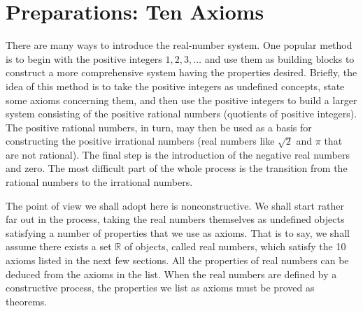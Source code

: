 	\chapter{Preparations: Ten Axioms}
    There are many ways to introduce the real-number system. One popular method is to begin with the positive integers \(1, 2, 3, \ldots\) and use them as building blocks to construct a more comprehensive system having the properties desired. Briefly, the idea of this method is to take the positive integers as undefined concepts, state some axioms concerning them, and then use the positive integers to build a larger system consisting of the positive rational numbers (quotients of positive integers). The positive rational numbers, in turn, may then be used as a basis for constructing the positive irrational numbers (real numbers like \(\sqrt{2}\) and \(\pi\) that are not rational). The final step is the introduction of the negative real numbers and zero. The most difficult part of the whole process is the transition from the rational numbers to the irrational numbers.

    The point of view we shall adopt here is nonconstructive. We shall start rather far out in the process, taking the real numbers themselves as undefined objects satisfying a number of properties that we use as axioms. That is to say, we shall assume there exists a set \(\mathbb{R}\) of objects, called real numbers, which satisfy the 10 axioms listed in the next few sections. All the properties of real numbers can be deduced from the axioms in the list. When the real numbers are defined by a constructive process, the properties we list as axioms must be proved as theorems.

